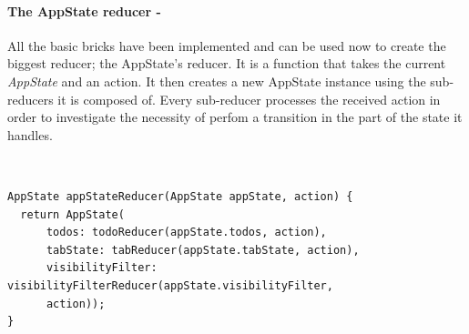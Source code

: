 \paragraph{The AppState reducer - }
\label{subpar:todo_app_bloc_core_state}
All the basic bricks have been implemented and can be used now to create the biggest reducer; the AppState's reducer. It is a function that takes the current \textit{AppState} and an action. It then creates a new AppState instance using the sub-reducers it is composed of. Every sub-reducer processes the received action in order to investigate the necessity of perfom a transition in the part of the state it handles. 
\begin{code}
\mbox{}\\
 \mbox{}
		\label{code:2.14}
\begin{verbatim}
AppState appStateReducer(AppState appState, action) {
  return AppState(
      todos: todoReducer(appState.todos, action),
      tabState: tabReducer(appState.tabState, action),
      visibilityFilter: visibilityFilterReducer(appState.visibilityFilter,
      action));
}
\end{verbatim}
\mbox{}
\end{code}

